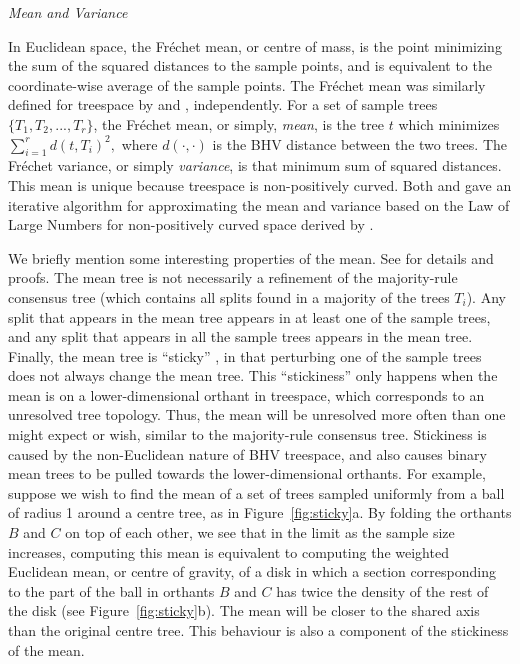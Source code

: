 \documentclass[12pt,letterpaper]{article}
\theoremstyle{plain}
\theoremstyle{definition}
\renewcommand{\subsection}[1]{%
\bigskip
\begin{center}
\begin{large}
\normalfont\itshape #1
\end{large}
\end{center}}
\begin{document}
\subsection{Mean and Variance}
In Euclidean space, the Fr\'echet mean, or centre of mass, is the point minimizing the sum of the squared distances to the sample points, and is equivalent to the coordinate-wise average of the sample points.  The Fr\'echet mean was similarly defined for treespace by \citet{MillerOwenProvan2015} and \citet{Bacakmeanmedian}, independently.  For a set of sample trees $\{T_1, T_2, ..., T_r\}$, the Fr\'echet mean, or simply, \emph{mean}, is the tree $t$ which minimizes $\sum_{i=1}^r d(t,T_i)^2,$ where $d(\cdot,\cdot)$ is the BHV distance between the two trees.  The Fr\'echet variance, or simply \emph{variance}, is that minimum sum of squared distances.  This mean is unique because treespace is non-positively curved.  Both \citet{MillerOwenProvan2015} and \citet{Bacakmeanmedian} gave an iterative algorithm for approximating the mean and variance based on the Law of Large Numbers for non-positively curved space derived by \citet{Sturm03}.  

We briefly mention some interesting properties of the mean.  See \citet[Section 5]{MillerOwenProvan2015} for details and proofs. The mean tree is not necessarily a refinement of the majority-rule consensus tree (which contains all splits found in a majority of the trees $T_i$). Any split that appears in the mean tree appears in at least one of the sample trees, and any split that appears in all the sample trees appears in the mean tree.  Finally, the mean tree is ``sticky'' \citep{hotz2013sticky}, in that perturbing one of the sample trees does not always change the mean tree. This ``stickiness'' only happens when the mean is on a lower-dimensional orthant in treespace, which corresponds to an unresolved tree topology.  Thus, the mean will be unresolved more often than one might expect or wish, similar to the majority-rule consensus tree.  Stickiness is caused by the non-Euclidean nature of BHV treespace, and also causes binary mean trees to be pulled towards the lower-dimensional orthants.  For example, suppose we wish to find the mean of a set of trees sampled uniformly from a ball of radius 1 around a centre tree, as in Figure~\ref{fig:sticky}a.  By folding the orthants $B$ and $C$ on top of each other, we see that in the limit as the sample size increases, computing this mean is equivalent to computing the weighted Euclidean mean, or centre of gravity, of a disk in which a section corresponding to the part of the ball in orthants $B$ and $C$ has twice the density of the rest of the disk (see Figure~\ref{fig:sticky}b).  The mean will be closer to the shared axis than the original centre tree.  This behaviour is also a component of the stickiness of the mean.
\end{document}
